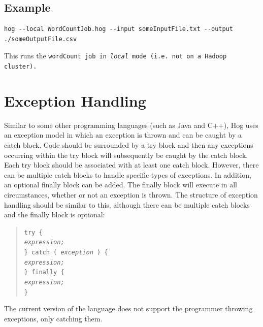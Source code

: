\documentclass{report}
\begin{document}
\subsection{Example} %
\label{sub:example}

\begin{verbatim}
hog --local WordCountJob.hog --input someInputFile.txt --output ./someOutputFile.csv
\end{verbatim}

This runs the \tt wordCount \rm job in \emph{local} mode (i.e. not on a Hadoop
cluster).



\section{Exception Handling} %
\label{sec:exception_handling}

Similar to some other programming languages (such as Java and C++), Hog uses an
exception model in which an exception is thrown and can be caught by a catch
block. Code should be surrounded by a try block and then any exceptions
occurring within the try block will subsequently be caught by the catch block.
Each try block should be associated with at least one catch block. However,
there can be multiple catch blocks to handle specific types of exceptions. In
addition, an optional finally block can be added. The finally block will
execute in all circumstances, whether or not an exception is thrown. The
structure of exception handling should be similar to this, although there can
be multiple catch blocks and the finally block is optional:

\begin{quotation}
\tt try \{ \rm \\
\indent \indent \emph{expression;} \\
\tt \indent \} catch ( \rm \emph{exception} \tt ) \rm \{ \\
\indent \indent \emph{expression;} \\
\tt \indent \} finally \rm \{ \\
\indent \indent \emph{expression;} \\
\tt \indent \}
\end{quotation}

The current version of the language does not support the programmer throwing
exceptions, only catching them.
\end{document}
